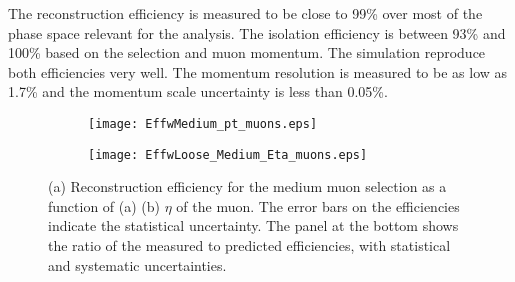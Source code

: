 The reconstruction efficiency is measured to be close to 99\% over most of the phase space relevant for the analysis. 
The isolation efficiency is between 93\% and 100\% based on the selection and muon momentum. The simulation reproduce both efficiencies very well.
The  momentum resolution is measured to be as low as 1.7\% and the momentum scale uncertainty is less than  0.05\%.

\begin{figure}[htb!]
\centering
\begin{subfigure}[t]{0.56\textwidth}
\texttt{[image: EffwMedium\_pt\_muons.eps]}
\subcaption{}
\label{fig:}
\end{subfigure}
\begin{subfigure}[t]{0.43\textwidth}
\texttt{[image: EffwLoose\_Medium\_Eta\_muons.eps]}
\subcaption{}
\label{fig:}
\end{subfigure}
\vspace{-0.25cm}
\caption{(a) Reconstruction efficiency for the medium muon selection as a function of (a) \pt (b) $\eta$ of the muon.
 The error bars on the efficiencies indicate the statistical uncertainty. The panel at the bottom shows the ratio of the measured to predicted efficiencies, with statistical and systematic uncertainties.
}
\label{fig:exp.reco.muon}
\end{figure} 


